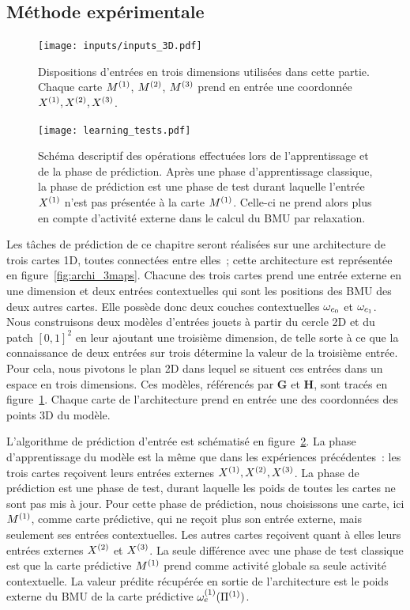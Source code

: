 \documentclass[../main]{subfiles}
\begin{document}
\subsection{Méthode expérimentale}
\begin{figure}
	\texttt{[image: inputs/inputs\_3D.pdf]}
	\caption{Dispositions d'entrées en trois dimensions utilisées dans cette partie. Chaque carte $M^{({1})}$, $M^{({2})}$, $M^{({3})}$ prend en entrée une coordonnée $X^{({1})}, X^{({2})}, X^{({3})}$. \label{fig:inputs_3D}}
\end{figure}
\begin{figure}
	\texttt{[image: learning\_tests.pdf]}
	\caption{Schéma descriptif des opérations effectuées lors de l'apprentissage et de la phase de prédiction. Après une phase d'apprentissage classique, la phase de prédiction est une phase de test durant laquelle l'entrée $X^{({1})}$ n'est pas présentée à la carte $M^{({1})}$. Celle-ci ne prend alors plus en compte d'activité externe dans le calcul du BMU par relaxation. \label{fig:schema_pred}}
\end{figure}


Les tâches de prédiction de ce chapitre seront réalisées sur une architecture de trois cartes 1D, toutes connectées entre elles~; cette architecture est représentée en figure~\ref{fig:archi_3maps}.
Chacune des trois cartes prend une entrée externe en une dimension et deux entrées contextuelles qui sont les positions des BMU des deux autres cartes. Elle possède donc deux couches contextuelles $\omega_{c_0}$ et $\omega_{c_1}$.
Nous construisons deux modèles d'entrées jouets à partir du cercle 2D et du patch $[0,1]^2$ en leur ajoutant une troisième dimension, de telle sorte à ce que la connaissance de deux entrées sur trois détermine la valeur de la troisième entrée. Pour cela, nous pivotons le plan 2D dans lequel se situent ces entrées dans un espace en trois dimensions.
Ces modèles, référencés par \textbf{G} et \textbf{H}, sont tracés en figure~\ref{fig:inputs_3D}.
Chaque carte de l'architecture prend en entrée une des coordonnées des points 3D du modèle.


L'algorithme de prédiction d'entrée est schématisé en figure~\ref{fig:schema_pred}.
La phase d'apprentissage du modèle est la même que dans les expériences précédentes~: les trois cartes reçoivent leurs entrées externes $X^{({1})},X^{({2})}, X^{({3})}$.
La phase de prédiction est une phase de test, durant laquelle les poids de toutes les cartes ne sont pas mis à jour.
Pour cette phase de prédiction, nous choisissons une carte, ici $M^{({1})}$, comme carte prédictive, qui ne reçoit plus son entrée externe, mais seulement ses entrées contextuelles.
Les autres cartes reçoivent quant à elles leurs entrées externes $X^{({2})}$ et $X^{({3})}$.
La seule différence avec une phase de test classique est que la carte prédictive $M^{({1})}$ prend comme activité globale sa seule activité contextuelle.
La valeur prédite récupérée en sortie de l'architecture est le poids externe du BMU de la carte prédictive $\omega_{e}^{({1})}(\Pi^{({1})})$.
\end{document}
